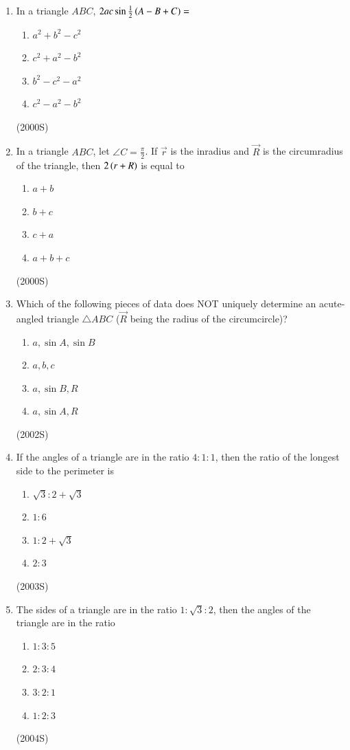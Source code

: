\begin{enumerate}[label=\thesubsection.\arabic*,ref=\thesubsection.\theenumi]
\item In a triangle $ABC$, $2ac\sin\frac{1}{2}\left(A-B+C\right) = $
\begin{enumerate}
\item $a^2 + b^2 - c^2$
\item $c^2 + a^2 - b^2$
\item $b^2 - c^2 - a^2$
\item $c^2 - a^2 - b^2$
\end{enumerate}
\hfill (2000S)

\item In a triangle $ABC$, let $\angle C = \frac{\pi}{2}$. If $\vec{r}$ is the inradius and $\vec{R}$ is the circumradius of the triangle, then $2\left(r+R\right)$ is equal to
\begin{enumerate}
\item $a+b$
\item $b+c$
\item $c+a$
\item $a+b+c$
\end{enumerate}
\hfill (2000S)


\item Which of the following pieces of data does NOT uniquely determine an acute-angled triangle $\triangle ABC$ ($\vec{R}$ being the radius of the circumcircle)?
\begin{enumerate}
\item $a, \sin A, \sin B$
\item $a, b, c$
\item $a, \sin B, R$
\item $a, \sin A, R$
\end{enumerate}
\hfill (2002S)

\item If the angles of a triangle are in the ratio $4\colon1\colon1$, then the ratio of the longest side to the perimeter is
\begin{enumerate}
\item $\sqrt{3}\colon2+\sqrt{3}$
\item $1\colon6$
\item $1\colon2+\sqrt{3}$
\item $2\colon3$
\end{enumerate}
\hfill (2003S)

\item The sides of a triangle are in the ratio $1\colon\sqrt{3}\colon2$, then the angles of the triangle are in the ratio
\begin{enumerate}
\item $1\colon3\colon5$
\item $2\colon3\colon4$
\item $3\colon2\colon1$
\item $1\colon2\colon3$
\end{enumerate}
\hfill (2004S)


\end{enumerate}
